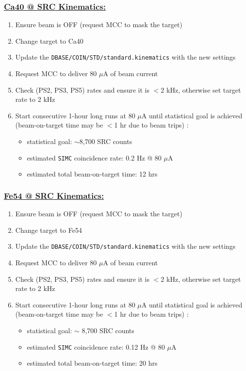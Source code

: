 \documentclass{article}
\begin{document}
\subsubsection*{\underline{Ca40 @ SRC Kinematics:}}
\begin{enumerate}
\item Ensure beam is OFF (request MCC to mask the target)
\item Change target to Ca40
\item Update the \texttt{DBASE/COIN/STD/standard.kinematics} with the new settings
\item Request MCC to deliver 80 $\mu$A of beam current
\item Check (PS2, PS3, PS5) rates and ensure it is $<$2 kHz, otherwise set target rate to 2 kHz
\item Start consecutive 1-hour long runs at 80 $\mu$A until statistical goal is achieved \\ (beam-on-target time may be $<$1 hr due to beam trips) :
\begin{itemize}
    \item statistical goal: $\sim$8,700 SRC counts
    \item estimated \texttt{SIMC} coincidence rate: 0.2 Hz @ 80 $\mu$A
    \item estimated total beam-on-target time: 12 hrs
\end{itemize}
\end{enumerate}

\subsubsection*{\underline{Fe54 @ SRC Kinematics:}}
\begin{enumerate}
\item Ensure beam is OFF (request MCC to mask the target)
\item Change target to Fe54
\item Update the \texttt{DBASE/COIN/STD/standard.kinematics} with the new settings
\item Request MCC to deliver 80 $\mu$A of beam current
\item Check (PS2, PS3, PS5) rates and ensure it is $<$2 kHz, otherwise set target rate to 2 kHz
\item Start consecutive 1-hour long runs at 80 $\mu$A until statistical goal is achieved \\ (beam-on-target time may be $<$1 hr due to beam trips) :
\begin{itemize}
    \item statistical goal: $\sim$ 8,700 SRC counts
    \item estimated \texttt{SIMC} coincidence rate: 0.12 Hz @ 80 $\mu$A
    \item estimated total beam-on-target time: 20 hrs
\end{itemize}
\end{enumerate}
\end{document}
